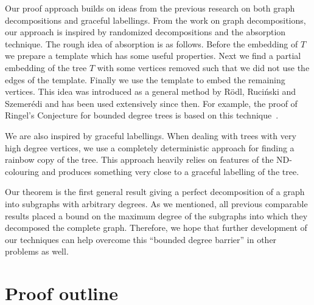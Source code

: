 \documentclass{article}
\theoremstyle{definition}
\begin{document}
 Our proof approach builds on ideas from the previous research on both graph decompositions and graceful labellings.
From the work on graph decompositions, our approach is inspired by randomized decompositions and the absorption technique. The rough idea of absorption is as follows.  Before the embedding of $T$ we prepare a template which has some useful properties. Next we find a partial embedding of the tree $T$ with some vertices removed such that we did not use the edges of the template.
Finally we use the template to embed the remaining vertices. This idea was introduced as a general method by R\"odl, Ruci\'nski and Szemer\'edi \cite{RRS} and has been used extensively since then. For example, the proof of Ringel's Conjecture for bounded degree trees is based on this technique~\cite{joos2016optimal}.

We are also inspired by graceful labellings. When dealing with  trees with very high degree vertices, we use a  completely deterministic approach  for finding a rainbow copy of the tree. This approach heavily relies on features of the ND-colouring and produces something very close to a graceful labelling of the tree.

Our theorem is the first general result giving a perfect decomposition of a graph into subgraphs with arbitrary degrees. As we mentioned, all previous comparable results placed  a bound on the maximum degree of the subgraphs into which they decomposed the complete graph. Therefore, we hope that further development of our techniques can help overcome this ``bounded degree barrier'' in other problems as well.





\section{Proof outline}\label{Section_proof_outline}






\end{document}
